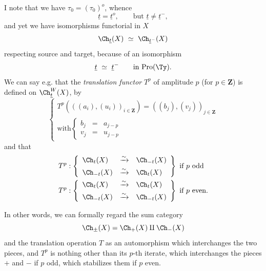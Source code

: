 I note that we have $\tau_0 = (\tau_0)^o$, whence
\[
\underline{t} = \underline{t}^o, \qquad \text{but } \underline{t} \neq \underline{t}^-,
\]
and yet we have isomorphisms functorial in $X$
\[
\Ch_{\underline{t}}(X) \ \simeq \ \Ch_{\underline{t}^-}(X)
\]
respecting source and target, because of an isomorphism
\[
\underline{t} \ \simeq \ \underline{t}^- \qquad \text{in Pro}(\Ty).
\]
We can say e.g. that the \textit{translation functor} $T^p$ of amplitude $p$ (for $p \in \mathbf{Z}$) is defined on $\Ch^{W}_{\underline{t}}(X)$, by
\[
\left\{ \begin{array}{l}
T^p(((a_i),(u_i))_{i \in \mathbf{Z}}) = ((b_j),(v_j))_{j \in \mathbf{Z}} \\[1ex]
\text{with} \left\{ \begin{array}{lcl} b_j & = & a_{j-p} \\[1ex] v_j & = & u_{j-p} \end{array} \right.
\end{array} \right.
\]
and that
\[
\begin{aligned}
T^p &: \left\{ \begin{array}{lcl} \Ch_{t}(X) & \xrightarrow{\sim} & \Ch_{-t}(X) \\[1ex] \Ch_{-t}(X) & \xrightarrow{\sim} & \Ch_{t}(X) \end{array} \right\} \ \text{if } p \text{ odd} \\
T^p &: \left\{ \begin{array}{lcl} \Ch_{t}(X) & \xrightarrow{\sim} & \Ch_{t}(X) \\[1ex] \Ch_{-t}(X) & \xrightarrow{\sim} & \Ch_{-t}(X) \end{array} \right\} \ \text{if } p \text{ even.}
\end{aligned} %
\]

In other words, we can formally regard the sum category
\[
\Ch_{\pm}(X) = \Ch_{+}(X) \amalg \Ch_{-}(X)
\]
and the translation operation $T$ as an automorphism which interchanges the two pieces, and $T^p$ is nothing other than its $p$-th iterate, which interchanges the pieces $+$ and $-$ if $p$ odd, which stabilizes them if $p$ even.


